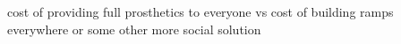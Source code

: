 \documentclass[a4paper]{article}
\begin{document}
cost of providing full prosthetics to everyone vs cost of building ramps
everywhere or some other more social solution





\cleardoublepage


%
%

\end{document}
